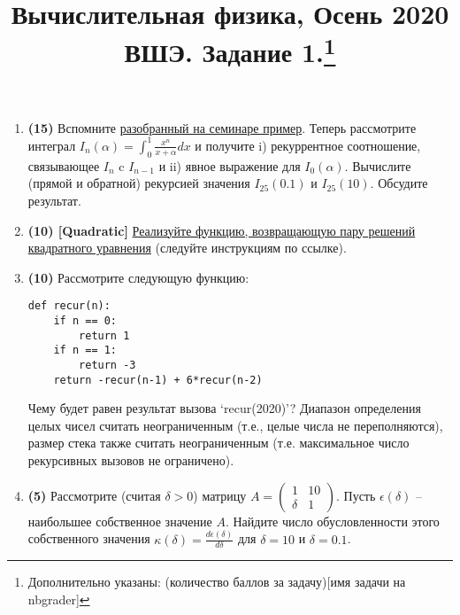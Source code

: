 \documentclass[prb,papersize=a4paper,notitlepage]{revtex4-1}%
\begin{document}
\title{Вычислительная физика, Осень 2020 ВШЭ. Задание 1.\footnote{Дополнительно указаны: (количество баллов за задачу)[имя задачи на nbgrader]}}
\maketitle


\begin{enumerate}
\item \textbf{(15)} Вспомните \href{https://github.com/ev-br/CP2020/blob/master/week_0_recurrence.ipynb}{разобранный на семинаре пример}. Теперь рассмотрите интеграл $I_n(\alpha) = \int_0^1 \frac{x^n}{x+\alpha} dx$ и получите i) рекуррентное соотношение, связывающее $I_{n}$ c $I_{n-1}$ и ii) явное выражение для $I_0(\alpha)$. Вычислите (прямой и обратной) рекурсией значения $I_{25}(0.1)$ и $I_{25}(10)$. Обсудите результат.
\item \textbf{(10) [Quadratic]} \href{https://github.com/ev-br/CP2020/blob/master/week_1_quadratic.ipynb}{Реализуйте функцию, возвращающую пару решений квадратного уравнения} (следуйте инструкциям по ссылке).
\item \textbf{(10)} Рассмотрите следующую функцию:
\lstset{language=Python}
\lstset{frame=lines}
\lstset{basicstyle=\ttfamily}
\begin{lstlisting}
def recur(n):
    if n == 0:
        return 1
    if n == 1:
        return -3
    return -recur(n-1) + 6*recur(n-2)
\end{lstlisting}

Чему будет равен результат вызова `recur(2020)'? Диапазон определения целых чисел считать неограниченным (т.е., целые числа не переполняются), размер стека также считать неограниченным (т.е. максимальное число рекурсивных вызовов не ограничено).
\item \textbf{(5)} Рассмотрите (считая $\delta>0$) матрицу $A=\begin{pmatrix}
1 & 10 \\
\delta &1 
\end{pmatrix}$. Пусть $\epsilon(\delta)$ -- наибольшее собственное значение $A$. Найдите число обусловленности этого собственного значения $\kappa(\delta)=\frac{d\epsilon(\delta)}{d\delta}$ для $\delta=10$ и $\delta=0.1$.


\end{enumerate}
\end{document}
